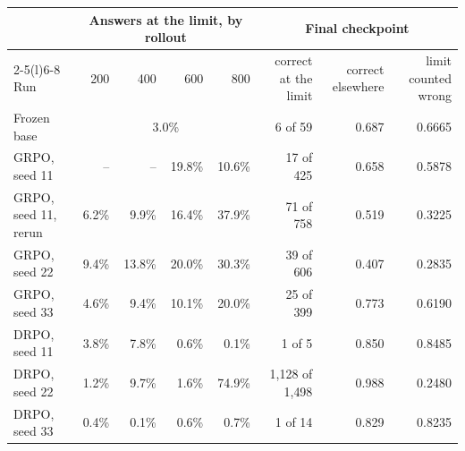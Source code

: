 \begin{tabularx}{\textwidth}{@{}Xrrrrrrr@{}}
\toprule
 & \multicolumn{4}{c}{Answers at the limit, by rollout} & \multicolumn{3}{c}{Final checkpoint} \\
\cmidrule(lr){2-5}\cmidrule(l){6-8}
Run & 200 & 400 & 600 & 800 & correct at the limit & correct elsewhere & limit counted wrong \\
\midrule
Frozen base & \multicolumn{4}{c}{3.0\%} & 6 of 59 & 0.687 & 0.6665 \\
GRPO, seed 11 & -- & -- & 19.8\% & 10.6\% & 17 of 425 & 0.658 & 0.5878 \\
GRPO, seed 11, rerun & 6.2\% & 9.9\% & 16.4\% & 37.9\% & 71 of 758 & 0.519 & 0.3225 \\
GRPO, seed 22 & 9.4\% & 13.8\% & 20.0\% & 30.3\% & 39 of 606 & 0.407 & 0.2835 \\
GRPO, seed 33 & 4.6\% & 9.4\% & 10.1\% & 20.0\% & 25 of 399 & 0.773 & 0.6190 \\
DRPO, seed 11 & 3.8\% & 7.8\% & 0.6\% & 0.1\% & 1 of 5 & 0.850 & 0.8485 \\
DRPO, seed 22 & 1.2\% & 9.7\% & 1.6\% & 74.9\% & 1{,}128 of 1{,}498 & 0.988 & 0.2480 \\
DRPO, seed 33 & 0.4\% & 0.1\% & 0.6\% & 0.7\% & 1 of 14 & 0.829 & 0.8235 \\
\bottomrule
\end{tabularx}
